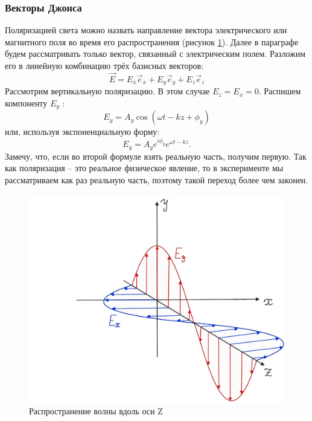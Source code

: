 \subsubsection{Векторы Джонса}
Поляризацией света можно назвать направление вектора электрического или магнитного поля во время его распространения (рисунок \ref{fig B.4}). Далее в параграфе будем рассматривать только вектор, связанный с электрическим полем. Разложим его в линейную комбинацию трёх базисных векторов:
\[
\Vec{E} = E_x \Vec{e}_x + E_y \Vec{e}_y + E_z \Vec{e}_z
\]
Рассмотрим вертикальную поляризацию. В этом случае $E_z = E_x = 0$. Распишем компоненту $E_y$ :
\[
E_y = A_y \cos(\omega t - kz + \phi_y)
\]
или, используя экспоненциальную форму:
\[
E_y = A_y e^{i\phi_y}e^{\omega t - kz}.
\]
Замечу, что, если во второй формуле взять реальную часть, получим первую. Так как поляризация -- это реальное физическое явление, то в эксперименте мы рассматриваем как раз реальную часть, поэтому такой переход более чем законен.
\begin{figure}[!ht]
\centering
\includegraphics[scale=0.23]{appendix/images/polarization.png}
\caption{Распространение волны вдоль оси Z}
\label{fig B.4}
\end{figure}

